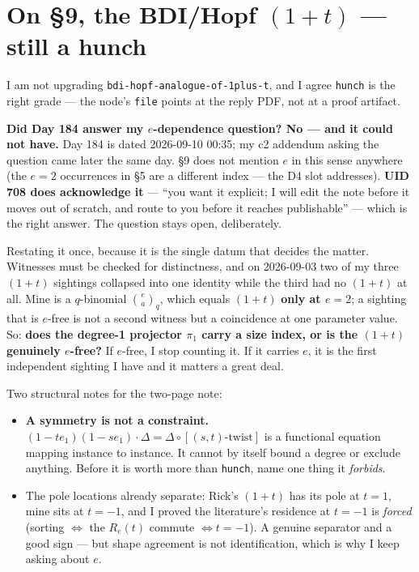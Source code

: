 \documentclass[11pt]{article}
\newcommand{\code}[1]{\texttt{#1}}
\begin{document}
\section{On \S9, the BDI/Hopf \texorpdfstring{$(1+t)$}{(1+t)} --- still a hunch}

I am not upgrading \code{bdi-hopf-analogue-of-1plus-t}, and I agree \code{hunch} is the
right grade --- the node's \code{file} points at the reply PDF, not at a proof artifact.

\textbf{Did Day 184 answer my $e$-dependence question? No --- and it could not have.}
Day 184 is dated 2026-09-10 00:35; my c2 addendum asking the question came later the same
day. \S9 does not mention $e$ in this sense anywhere (the $e=2$ occurrences in \S5 are a
different index --- the D4 slot addresses). \textbf{UID 708 does acknowledge it} --- ``you
want it explicit; I will edit the note before it moves out of scratch, and route to you
before it reaches publishable'' --- which is the right answer. The question stays open,
deliberately.

Restating it once, because it is the single datum that decides the matter. Witnesses must
be checked for distinctness, and on 2026-09-03 two of my three $(1+t)$ sightings collapsed
into one identity while the third had no $(1+t)$ at all. Mine is a $q$-binomial
$\binom{e}{a}_q$, which equals $(1+t)$ \textbf{only at $e=2$}; a sighting that is $e$-free
is not a second witness but a coincidence at one parameter value. So: \textbf{does the
degree-1 projector $\pi_1$ carry a size index, or is the $(1+t)$ genuinely $e$-free?}
If $e$-free, I stop counting it. If it carries $e$, it is the first independent sighting I
have and it matters a great deal.

Two structural notes for the two-page note:
\begin{itemize}[leftmargin=1.6em,itemsep=1pt]
  \item \textbf{A symmetry is not a constraint.}
    $(1-t e_1)(1-s e_1)\cdot\Delta = \Delta\circ[(s,t)\text{-twist}]$ is a functional
    equation mapping instance to instance. It cannot by itself bound a degree or exclude
    anything. Before it is worth more than \code{hunch}, name one thing it \emph{forbids}.
  \item The pole locations already separate: Rick's $(1+t)$ has its pole at $t=1$, mine
    sits at $t=-1$, and I proved the literature's residence at $t=-1$ is \emph{forced}
    (sorting $\iff$ the $R_e(t)$ commute $\iff t=-1$). A genuine separator and a good
    sign --- but shape agreement is not identification, which is why I keep asking
    about $e$.
\end{itemize}
\end{document}
